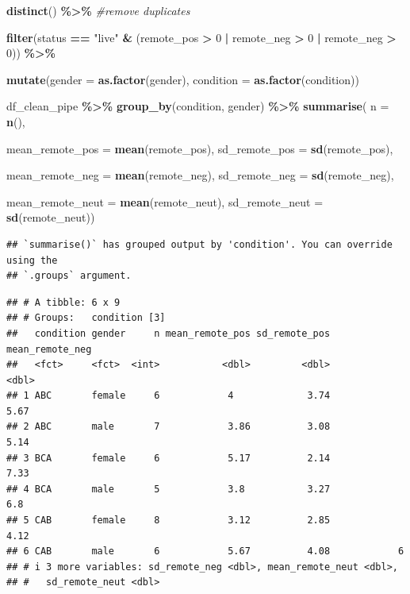 \documentclass[
]{book}
\newenvironment{Shaded}{\begin{snugshade}}{\end{snugshade}}
\newcommand{\AttributeTok}[1]{\textcolor[rgb]{0.13,0.29,0.53}{#1}}
\newcommand{\CommentTok}[1]{\textcolor[rgb]{0.56,0.35,0.01}{\textit{#1}}}
\newcommand{\DecValTok}[1]{\textcolor[rgb]{0.00,0.00,0.81}{#1}}
\newcommand{\FunctionTok}[1]{\textcolor[rgb]{0.13,0.29,0.53}{\textbf{#1}}}
\newcommand{\NormalTok}[1]{#1}
\newcommand{\SpecialCharTok}[1]{\textcolor[rgb]{0.81,0.36,0.00}{\textbf{#1}}}
\newcommand{\StringTok}[1]{\textcolor[rgb]{0.31,0.60,0.02}{#1}}
\begin{document}
\begin{Shaded}
\begin{Highlighting}[]
  \FunctionTok{distinct}\NormalTok{() }\SpecialCharTok{\%\textgreater{}\%}  \CommentTok{\#remove duplicates}
  
  \FunctionTok{filter}\NormalTok{(status }\SpecialCharTok{==} \StringTok{"live"} \SpecialCharTok{\&}\NormalTok{ (remote\_pos }\SpecialCharTok{\textgreater{}} \DecValTok{0} \SpecialCharTok{|}\NormalTok{ remote\_neg }\SpecialCharTok{\textgreater{}} \DecValTok{0} \SpecialCharTok{|}\NormalTok{ remote\_neg }\SpecialCharTok{\textgreater{}} \DecValTok{0}\NormalTok{)) }\SpecialCharTok{\%\textgreater{}\%} 
  
  
  \FunctionTok{mutate}\NormalTok{(}\AttributeTok{gender =} \FunctionTok{as.factor}\NormalTok{(gender),}
         \AttributeTok{condition =} \FunctionTok{as.factor}\NormalTok{(condition)) }
  
  
  
\NormalTok{df\_clean\_pipe }\SpecialCharTok{\%\textgreater{}\%} 
  \FunctionTok{group\_by}\NormalTok{(condition, gender) }\SpecialCharTok{\%\textgreater{}\%} 
  \FunctionTok{summarise}\NormalTok{(}
            \AttributeTok{n =} \FunctionTok{n}\NormalTok{(), }
                        
            \AttributeTok{mean\_remote\_pos =} \FunctionTok{mean}\NormalTok{(remote\_pos),}
            \AttributeTok{sd\_remote\_pos =} \FunctionTok{sd}\NormalTok{(remote\_pos),}
          
            \AttributeTok{mean\_remote\_neg =} \FunctionTok{mean}\NormalTok{(remote\_neg),}
            \AttributeTok{sd\_remote\_neg =} \FunctionTok{sd}\NormalTok{(remote\_neg),}
          
            \AttributeTok{mean\_remote\_neut =} \FunctionTok{mean}\NormalTok{(remote\_neut),}
            \AttributeTok{sd\_remote\_neut =} \FunctionTok{sd}\NormalTok{(remote\_neut))}
\end{Highlighting}
\end{Shaded}

\begin{verbatim}
## `summarise()` has grouped output by 'condition'. You can override using the
## `.groups` argument.
\end{verbatim}

\begin{verbatim}
## # A tibble: 6 x 9
## # Groups:   condition [3]
##   condition gender     n mean_remote_pos sd_remote_pos mean_remote_neg
##   <fct>     <fct>  <int>           <dbl>         <dbl>           <dbl>
## 1 ABC       female     6            4             3.74            5.67
## 2 ABC       male       7            3.86          3.08            5.14
## 3 BCA       female     6            5.17          2.14            7.33
## 4 BCA       male       5            3.8           3.27            6.8 
## 5 CAB       female     8            3.12          2.85            4.12
## 6 CAB       male       6            5.67          4.08            6   
## # i 3 more variables: sd_remote_neg <dbl>, mean_remote_neut <dbl>,
## #   sd_remote_neut <dbl>
\end{verbatim}
\end{document}
